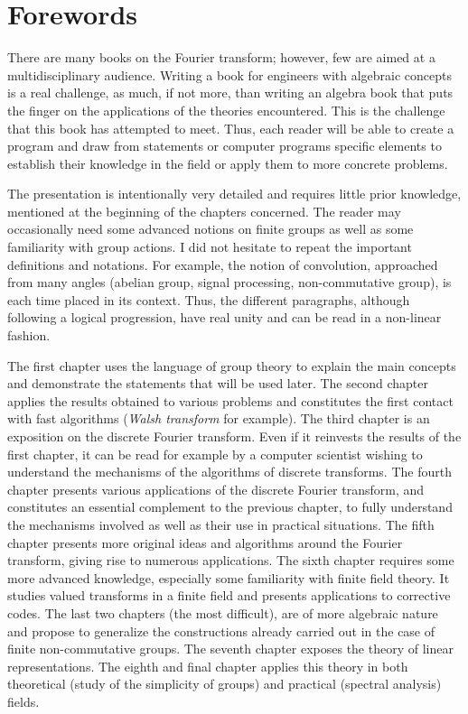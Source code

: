 \chapter*{Forewords}

There are many books on the Fourier transform; however, few are aimed at a multidisciplinary audience. Writing a book for engineers with algebraic concepts is a real challenge, as much, if not more, than writing an algebra book that puts the finger on the applications of the theories encountered. This is the challenge that this book has attempted to meet. Thus, each reader will be able to create a  program and draw from statements or computer programs specific elements to establish their knowledge in the field or apply them to more concrete problems.

The presentation is intentionally very detailed and requires little prior knowledge, mentioned at the beginning of the chapters concerned. 
The reader may occasionally need some advanced notions on finite groups as well as some familiarity with group actions. %
I did not hesitate to repeat the important definitions and notations. For example, the notion of convolution, approached from many angles (abelian group, signal processing, non-commutative group), is each time placed in its context. Thus, the different paragraphs, although following a logical progression, have real unity and can be read in a non-linear fashion.

The first chapter uses the language of group theory to explain the main concepts and demonstrate the statements that will be used later. The second chapter applies the results obtained to various problems and constitutes the first contact with fast algorithms (\textit{Walsh transform} for example). The third chapter is an exposition on the discrete Fourier transform. Even if it reinvests the results of the first chapter, it can be read for example by a computer scientist wishing to understand the mechanisms of the algorithms of discrete transforms. The fourth chapter presents various applications of the discrete Fourier transform, and constitutes an essential complement to the previous chapter, to fully understand the mechanisms involved as well as their use in practical situations. The fifth chapter presents more original ideas and algorithms around the Fourier transform, giving rise to numerous applications. The sixth chapter requires some more advanced knowledge, especially some familiarity with finite field theory. It studies valued transforms in a finite field and presents applications to corrective codes. The last two chapters (the most difficult), are of more algebraic nature and propose to generalize the constructions already carried out in the case of finite non-commutative groups. The seventh chapter exposes the theory of linear representations. The eighth and final chapter applies this theory in both theoretical (study of the simplicity of groups) and practical (spectral analysis) fields.

